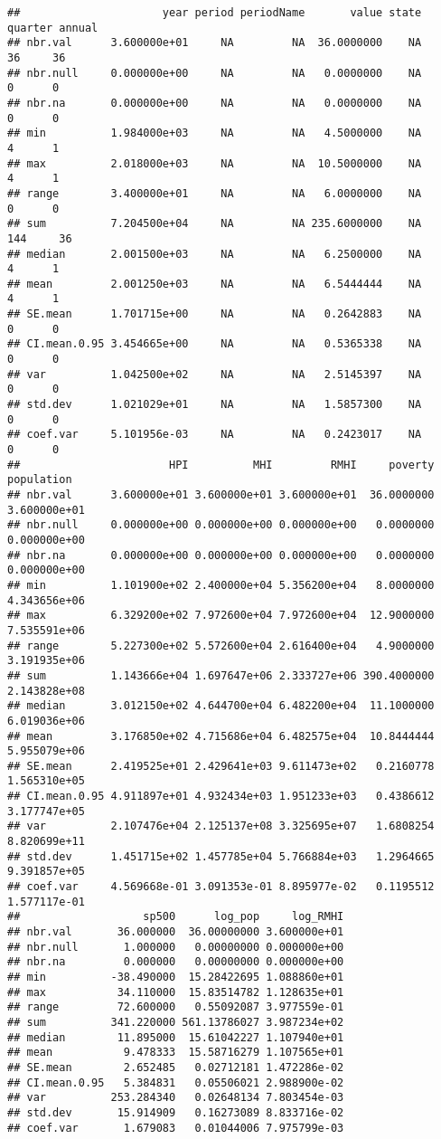 \documentclass[
]{article}
\begin{document}
\begin{verbatim}
##                      year period periodName       value state quarter annual
## nbr.val      3.600000e+01     NA         NA  36.0000000    NA      36     36
## nbr.null     0.000000e+00     NA         NA   0.0000000    NA       0      0
## nbr.na       0.000000e+00     NA         NA   0.0000000    NA       0      0
## min          1.984000e+03     NA         NA   4.5000000    NA       4      1
## max          2.018000e+03     NA         NA  10.5000000    NA       4      1
## range        3.400000e+01     NA         NA   6.0000000    NA       0      0
## sum          7.204500e+04     NA         NA 235.6000000    NA     144     36
## median       2.001500e+03     NA         NA   6.2500000    NA       4      1
## mean         2.001250e+03     NA         NA   6.5444444    NA       4      1
## SE.mean      1.701715e+00     NA         NA   0.2642883    NA       0      0
## CI.mean.0.95 3.454665e+00     NA         NA   0.5365338    NA       0      0
## var          1.042500e+02     NA         NA   2.5145397    NA       0      0
## std.dev      1.021029e+01     NA         NA   1.5857300    NA       0      0
## coef.var     5.101956e-03     NA         NA   0.2423017    NA       0      0
##                       HPI          MHI         RMHI     poverty   population
## nbr.val      3.600000e+01 3.600000e+01 3.600000e+01  36.0000000 3.600000e+01
## nbr.null     0.000000e+00 0.000000e+00 0.000000e+00   0.0000000 0.000000e+00
## nbr.na       0.000000e+00 0.000000e+00 0.000000e+00   0.0000000 0.000000e+00
## min          1.101900e+02 2.400000e+04 5.356200e+04   8.0000000 4.343656e+06
## max          6.329200e+02 7.972600e+04 7.972600e+04  12.9000000 7.535591e+06
## range        5.227300e+02 5.572600e+04 2.616400e+04   4.9000000 3.191935e+06
## sum          1.143666e+04 1.697647e+06 2.333727e+06 390.4000000 2.143828e+08
## median       3.012150e+02 4.644700e+04 6.482200e+04  11.1000000 6.019036e+06
## mean         3.176850e+02 4.715686e+04 6.482575e+04  10.8444444 5.955079e+06
## SE.mean      2.419525e+01 2.429641e+03 9.611473e+02   0.2160778 1.565310e+05
## CI.mean.0.95 4.911897e+01 4.932434e+03 1.951233e+03   0.4386612 3.177747e+05
## var          2.107476e+04 2.125137e+08 3.325695e+07   1.6808254 8.820699e+11
## std.dev      1.451715e+02 1.457785e+04 5.766884e+03   1.2964665 9.391857e+05
## coef.var     4.569668e-01 3.091353e-01 8.895977e-02   0.1195512 1.577117e-01
##                   sp500      log_pop     log_RMHI
## nbr.val       36.000000  36.00000000 3.600000e+01
## nbr.null       1.000000   0.00000000 0.000000e+00
## nbr.na         0.000000   0.00000000 0.000000e+00
## min          -38.490000  15.28422695 1.088860e+01
## max           34.110000  15.83514782 1.128635e+01
## range         72.600000   0.55092087 3.977559e-01
## sum          341.220000 561.13786027 3.987234e+02
## median        11.895000  15.61042227 1.107940e+01
## mean           9.478333  15.58716279 1.107565e+01
## SE.mean        2.652485   0.02712181 1.472286e-02
## CI.mean.0.95   5.384831   0.05506021 2.988900e-02
## var          253.284340   0.02648134 7.803454e-03
## std.dev       15.914909   0.16273089 8.833716e-02
## coef.var       1.679083   0.01044006 7.975799e-03
\end{verbatim}
\end{document}
